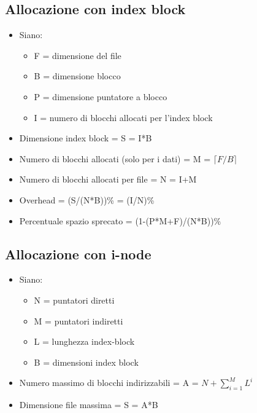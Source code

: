 \documentclass[10pt]{article}
\begin{document}
\subsection*{Allocazione con index block}
\begin{itemize}
    \item Siano:
    \begin{itemize}
        \item F = dimensione del file
        \item B = dimensione blocco
        \item P = dimensione puntatore a blocco
        \item I = numero di blocchi allocati per l'index block
    \end{itemize}
    \item Dimensione index block = S = I*B
    \item Numero di blocchi allocati (solo per i dati) = M = $\lceil F/B \rceil$
    \item Numero di blocchi allocati per file = N = I+M
    \item Overhead = (S/(N*B))\% = (I/N)\%
    \item Percentuale spazio sprecato = (1-(P*M+F)/(N*B))\%
\end{itemize}
\subsection*{Allocazione con i-node}
\begin{itemize}
    \item Siano:
    \begin{itemize}
        \item N = puntatori diretti 
        \item M = puntatori indiretti
        \item L = lunghezza index-block
        \item B = dimensioni index block
    \end{itemize}
    \item Numero massimo di blocchi indirizzabili = A = $N+\sum_{i = 1}^{M}L^{i}$  
    \item Dimensione file massima = S = A*B
\end{itemize}
\end{document}
